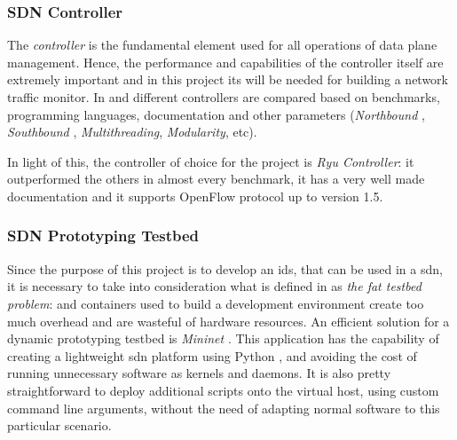 
\subsubsection{SDN Controller}
\label{subsubsec:sdn-controller}

The \textit{controller} is the fundamental element used for all operations of data plane management. Hence, the performance and capabilities of the controller itself are extremely important and in this project its  will be needed for building a network traffic monitor. In \cite{Bondkovskii2016} and \cite{Zhu2019} different controllers are compared based on benchmarks, programming languages, documentation and other parameters (\textit{Northbound }, \textit{Southbound }, \textit{Multithreading}, \textit{Modularity}, etc).
\par In light of this, the controller of choice for the project is \textit{Ryu Controller}: it outperformed the others in almost every benchmark, it has a very well made documentation \cite{RyuDoc} and it supports OpenFlow protocol up to version 1.5.


\subsubsection{SDN Prototyping Testbed}
\label{subsec:sdn-testbed}

Since the purpose of this project is to develop an \gls{ids}, that can be used in a \gls{sdn}, it is necessary to take into consideration what is defined in \cite{Lantz2015} as \textit{the fat testbed problem}:  and containers used to build a development environment create too much overhead and are wasteful of hardware resources. An efficient solution for a dynamic prototyping testbed is \textit{Mininet} \cite{MininetWebsite}. This application has the capability of creating a lightweight \gls{sdn} platform using Python , and avoiding the cost of running unnecessary software as kernels and daemons. It is also pretty straightforward to deploy additional scripts onto the virtual host, using custom command line arguments, without the need of adapting normal software to this particular scenario.


